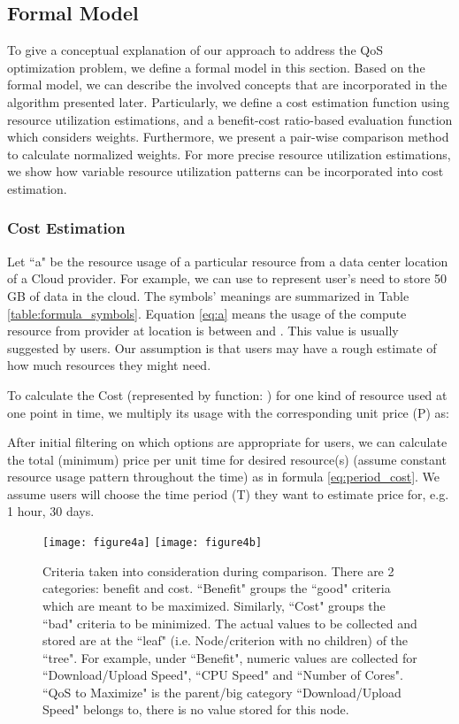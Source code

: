 \documentclass[journal]{IEEEtran}
\begin{document}
\subsection{Formal Model }
\label{subsec:formal_model}
To give a conceptual explanation of our approach to address the QoS optimization problem, we define a formal model in this section. Based on the formal model, we can describe the involved concepts that are incorporated in the algorithm presented later. Particularly, we define a cost estimation function using resource utilization estimations, and a benefit-cost ratio-based evaluation function which considers weights. Furthermore, we present a pair-wise comparison method to calculate normalized weights. For more precise resource utilization estimations, we show how variable resource utilization patterns can be incorporated into cost estimation.


\subsubsection{Cost Estimation}

Let ``a" be the resource usage of a particular resource from a data center location of a Cloud provider. For example, we can use  to represent user's need to store 50 GB of data in the cloud. The symbols' meanings are summarized in Table \ref{table:formula_symbols}. Equation \ref{eq:a} means the usage of the compute resource  from provider  at location  is between  and . This value is usually suggested by users. Our assumption is that users may have a rough estimate of how much resources they might need.

To calculate the Cost (represented by function: ) for one kind of resource used at one point in time, we multiply its usage with the corresponding unit price (P) as:


After initial filtering on which options are appropriate for users, we can calculate the total (minimum) price per unit time for desired resource(s) (assume constant resource usage pattern throughout the time) as in formula \ref{eq:period_cost}. We assume users will choose the time period (T) they want to estimate price for, e.g. 1 hour, 30 days.


\begin{figure}[!h]
 \centering
 \texttt{[image: figure4a]}
  \texttt{[image: figure4b]}
 \caption{ Criteria taken into consideration during comparison. There are 2 categories: benefit and cost. ``Benefit" groups the ``good" criteria which are meant to be maximized. Similarly, ``Cost" groups the ``bad" criteria to be minimized. The actual values to be collected and stored are at the ``leaf" (i.e. Node/criterion with no children) of the ``tree". For example, under ``Benefit", numeric values are collected for ``Download/Upload Speed", ``CPU Speed" and ``Number of Cores". ``QoS to Maximize" is the parent/big category ``Download/Upload Speed" belongs to, there is no value stored for this node.}
\label{fig4}
\end{figure}
\end{document}
